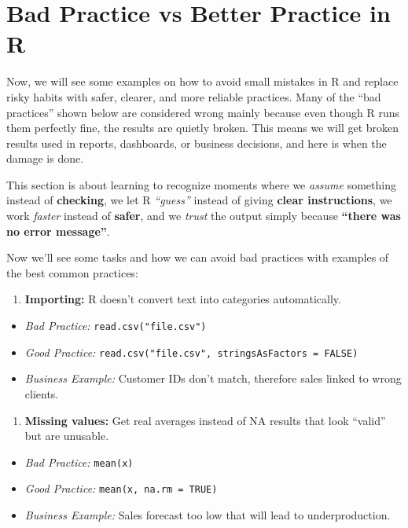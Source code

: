 \documentclass[
  stu,
  floatsintext,
  longtable,
  a4paper,
  nolmodern,
  notxfonts,
  notimes,
  colorlinks=true,linkcolor=blue,citecolor=blue,urlcolor=blue]{apa7}
\providecommand{\tightlist}{%
  \setlength{\itemsep}{0pt}\setlength{\parskip}{0pt}}
\begin{document}
\section{Bad Practice vs Better Practice in
R}\label{bad-practice-vs-better-practice-in-r}

Now, we will see some examples on how to avoid small mistakes in R and
replace risky habits with safer, clearer, and more reliable practices.
Many of the ``bad practices'' shown below are considered wrong mainly
because even though R runs them perfectly fine, the results are quietly
broken. This means we will get broken results used in reports,
dashboards, or business decisions, and here is when the damage is done.

This section is about learning to recognize moments where we
\emph{assume} something instead of \textbf{checking}, we let R
\emph{``guess''} instead of giving \textbf{clear instructions}, we work
\emph{faster} instead of \textbf{safer}, and we \emph{trust} the output
simply because \textbf{``there was no error message''}.

Now we'll see some tasks and how we can avoid bad practices with
examples of the best common practices:

\begin{enumerate}
\def\labelenumi{\arabic{enumi}.}
\tightlist
\item
  \textbf{Importing:} R doesn't convert text into categories
  automatically.
\end{enumerate}

\begin{itemize}
\tightlist
\item
  \emph{Bad Practice:} \texttt{read.csv("file.csv")}
\item
  \emph{Good Practice:}
  \texttt{read.csv("file.csv",\ stringsAsFactors\ =\ FALSE)}
\item
  \emph{Business Example:} Customer IDs don't match, therefore sales
  linked to wrong clients.
\end{itemize}

\begin{enumerate}
\def\labelenumi{\arabic{enumi}.}
\setcounter{enumi}{1}
\tightlist
\item
  \textbf{Missing values:} Get real averages instead of NA results that
  look ``valid'' but are unusable.
\end{enumerate}

\begin{itemize}
\tightlist
\item
  \emph{Bad Practice:} \texttt{mean(x)}
\item
  \emph{Good Practice:} \texttt{mean(x,\ na.rm\ =\ TRUE)}
\item
  \emph{Business Example:} Sales forecast too low that will lead to
  underproduction.
\end{itemize}
\end{document}
